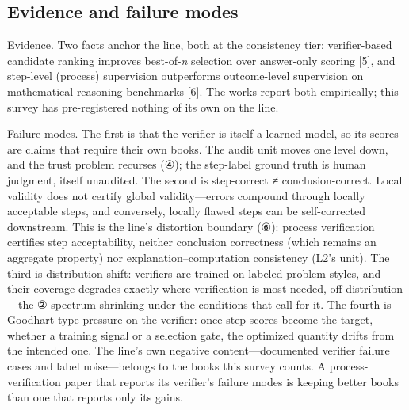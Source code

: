 \documentclass[11pt]{article}
\begin{document}
\subsection{Evidence and failure modes}
\noindent Evidence. Two facts anchor the line, both at the consistency tier: verifier-based candidate ranking improves best-of-\emph{n} selection over answer-only scoring [5], and step-level (process) supervision outperforms outcome-level supervision on mathematical reasoning benchmarks [6]. The works report both empirically; this survey has pre-registered nothing of its own on the line.\par
\noindent Failure modes. The first is that the verifier is itself a learned model, so its scores are claims that require their own books. The audit unit moves one level down, and the trust problem recurses (④); the step-label ground truth is human judgment, itself unaudited. The second is step-correct ≠ conclusion-correct. Local validity does not certify global validity—errors compound through locally acceptable steps, and conversely, locally flawed steps can be self-corrected downstream. This is the line's distortion boundary (⑥): process verification certifies step acceptability, neither conclusion correctness (which remains an aggregate property) nor explanation–computation consistency (L2's unit). The third is distribution shift: verifiers are trained on labeled problem styles, and their coverage degrades exactly where verification is most needed, off-distribution—the ② spectrum shrinking under the conditions that call for it. The fourth is Goodhart-type pressure on the verifier: once step-scores become the target, whether a training signal or a selection gate, the optimized quantity drifts from the intended one. The line's own negative content—documented verifier failure cases and label noise—belongs to the books this survey counts. A process-verification paper that reports its verifier's failure modes is keeping better books than one that reports only its gains.\par
\end{document}
